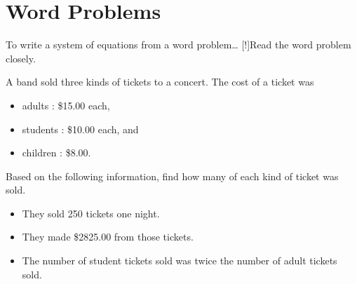 \section{Word Problems}

\begin{myConceptSteps}{To write a system of equations from a word problem\dots}
    [!]{Read the word problem closely.}
    \end{myConceptSteps}
  
    \myWideProblemWithContent
    {
      A band sold three kinds of tickets to a concert. 
      The cost of a ticket was 
      \begin{itemize}[nosep]
        \item adults : \$15.00 each, 
        \item students : \$10.00 each, and 
        \item children : \$8.00.
      \end{itemize}
      Based on the following information, 
      find how many of each kind of ticket was sold.
      \begin{itemize}[nosep]
        \item They sold 250 tickets one night.
        \item They made \$2825.00 from those tickets.
        \item The number of student tickets sold was twice the number of adult tickets sold.
      \end{itemize}
    \begin{center}
      \mySystemTable[10][4]
    \end{center}
    }  